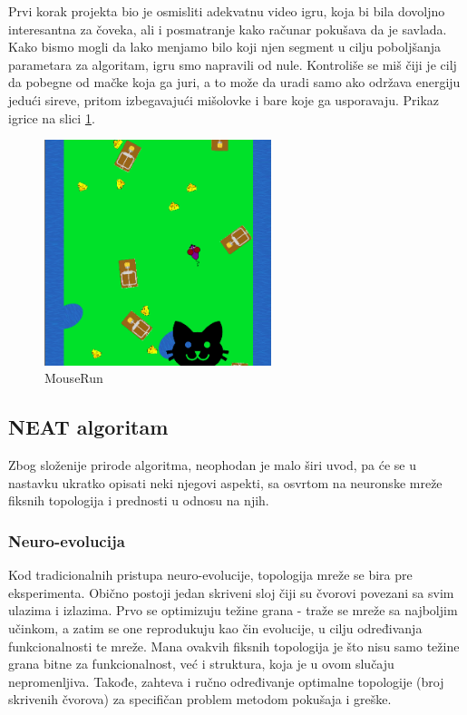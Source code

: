 \documentclass[a4paper]{article}
\begin{document}
Prvi korak projekta bio je osmisliti adekvatnu video igru, koja bi bila dovoljno interesantna za čoveka, ali i posmatranje kako računar pokušava da je savlada. Kako bismo mogli da lako menjamo bilo koji njen segment u cilju poboljšanja parametara za algoritam, igru smo napravili od nule.
Kontroliše se miš čiji je cilj da pobegne od mačke koja ga juri, a to može da uradi samo ako održava energiju jedući sireve, pritom izbegavajući mišolovke i bare koje ga usporavaju. Prikaz igrice na slici \ref{fig:mouserun_img}.

\begin{figure}[!h]
\begin{center}
\includegraphics[width=250px, keepaspectratio]{mouse_run_1.png}
\end{center}
\caption{MouseRun}
\label{fig:mouserun_img}
\end{figure}

\subsection{NEAT algoritam}
\label{neat}

Zbog složenije prirode algoritma, neophodan je malo širi uvod, pa će se u nastavku ukratko opisati neki njegovi aspekti, sa osvrtom na neuronske mreže fiksnih topologija i prednosti u odnosu na njih.

\subsubsection*{Neuro-evolucija}
\label{neuro_evolucija}

Kod tradicionalnih pristupa neuro-evolucije, topologija mreže se bira pre eksperimenta. Obično postoji jedan skriveni sloj čiji su čvorovi povezani sa svim ulazima i izlazima. Prvo se optimizuju težine grana - traže se mreže sa najboljim učinkom, a zatim se one reprodukuju kao čin evolucije, u cilju određivanja funkcionalnosti te mreže. Mana ovakvih fiksnih topologija je što nisu samo težine grana bitne za funkcionalnost, već i struktura, koja je u ovom slučaju nepromenljiva. Takođe, zahteva i ručno određivanje optimalne topologije (broj skrivenih čvorova) za specifičan problem metodom pokušaja i greške.
\end{document}
